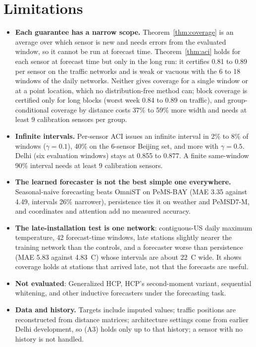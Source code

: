 \section{Limitations}
\label{sec:limitations}
\begin{itemize}
\item \textbf{Each guarantee has a narrow scope.} Theorem~\ref{thm:coverage} is an average over which sensor is
new and needs errors from the evaluated window, so it cannot be run at forecast time. Theorem~\ref{thm:aci} holds
for each sensor at forecast time but only in the long run: it certifies 0.81 to 0.89 per sensor on the traffic
networks and is weak or vacuous with the 6 to 18 windows of the daily networks. Neither gives coverage for a single
window or at a point location, which no distribution-free method can; block coverage is certified only for long
blocks (worst week 0.84 to 0.89 on traffic), and group-conditional coverage by distance costs 37\% to 59\% more width
and needs at least 9 calibration sensors per group.

\item \textbf{Infinite intervals.} Per-sensor ACI issues an infinite interval in 2\% to 8\% of windows
($\gamma=0.1$), 40\% on the 6-sensor Beijing set, and more with $\gamma=0.5$. Delhi (six evaluation windows) stays at 0.855 to 0.877. A finite same-window 90\% interval needs at least 9 calibration sensors.
\item \textbf{The learned forecaster is not the best simple one everywhere.} Seasonal-naive forecasting
beats OmniST on PeMS-BAY (MAE 3.35 against 4.49, intervals 26\% narrower), persistence ties it on weather
and PeMSD7-M, and coordinates and attention add no measured accuracy. 
\item \textbf{The late-installation test is one network}: contiguous-US daily maximum temperature, 42 forecast-time
windows, late stations slightly nearer the training network than the controls, and a forecaster worse than
persistence (MAE 5.83 against 4.83~\textdegree C) whose intervals are about 22~\textdegree C wide. It shows coverage
holds at stations that arrived late, not that the forecasts are useful.
\item \textbf{Not evaluated}: Generalized HCP, HCP's second-moment variant, sequential whitening, and other
inductive forecasters under the forecasting task.
\item \textbf{Data and history.} Targets include imputed values; traffic positions are reconstructed from distance matrices; architecture settings come from earlier Delhi development, so (A3) holds only up to that history; a sensor with no history is not handled.
\end{itemize}

